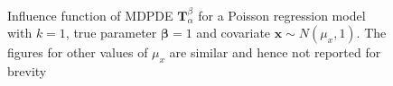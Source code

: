 \documentclass[a4paper]{article}%
\begin{document}
\begin{figure}[!h]
\centering
 ~
{} ~
\newline
{} ~
{} ~
\caption{Influence function of MDPDE $\boldsymbol{T}_{\alpha}^{\beta}$ for a
Poisson regression model with $k=1$, true parameter $\boldsymbol{\beta}=1$ and
covariate $\boldsymbol{x}\sim N(\mu_{x},1)$.
The figures for other values of $\mu_x$ are similar and hence not reported for brevity}
\label{FIG:IF_MDPDE}%
\end{figure}
\end{document}
